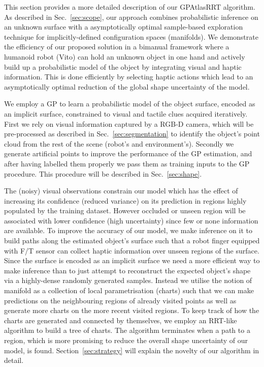 This section provides a more detailed description of our GPAtlasRRT algorithm. As described in Sec.~\ref{sec:scope}, our approach combines probabilistic inference on an unknown surface with a asymptotically optimal sample-based exploration technique for implicitly-defined configuration spaces (manifolds). We demonstrate the efficiency of our proposed solution in a bimanual framework where a humanoid robot (Vito) can hold an unknown object in one hand and actively build up a probabilistic model of the object by integrating visual and haptic information. This is done efficiently by selecting haptic actions which lead to an asymptotically optimal reduction of the global shape uncertainty of the model. 

We employ a GP to learn a probabilistic model of the object surface, encoded as an implicit surface, constrained to visual and tactile clues acquired iteratively. First we rely on visual information captured by a RGB-D camera, which will be pre-processed as described in Sec.~\ref{sec:segmentation} to identify the object's point cloud from the rest of the scene (robot's and environment's). Secondly we generate artificial points to improve the performance of the GP estimation, and after having labelled them properly we pass them as training inputs to the GP procedure. This procedure will be described in Sec.~\ref{sec:shape}. 

The (noisy) visual observations constrain our model which has the effect of increasing its confidence (reduced variance) on its prediction in regions highly populated by the training dataset. However occluded or unseen region will be associated with lower confidence (high uncertainty) since few or none information are available.  
To improve the accuracy of our model, we make inference on it to build paths along the estimated object's surface such that a robot finger equipped with F/T sensor can collect haptic information over unseen regions of the surface. Since the surface is encoded as an implicit surface we need a more efficient way to make inference than to just attempt to reconstruct the expected object's shape via a highly-dense randomly generated samples. Instead we utilise the notion of manifold as a collection of local parametrisation (charts) such that we can make predictions on the neighbouring regions of already visited points as well as generate more charts on the more recent visited regions. To keep track of how the charts are generated and connected by themselves, we employ an RRT-like algorithm to build a tree of charts. The algorithm terminates when a path to a region, which is more promising to reduce the overall shape uncertainty of our model, is found.
Section~\ref{sec:strategy} will explain the novelty of our algorithm in detail.  

